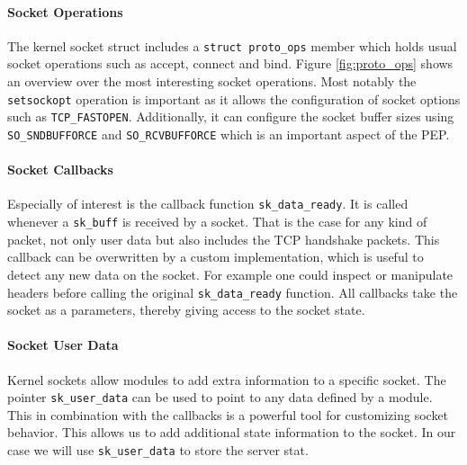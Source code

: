 \documentclass[a4paper,english, 11pt]{report}
\begin{document}
\paragraph{Socket Operations}
The kernel socket struct includes a \verb|struct proto_ops| member which holds usual socket operations such as accept, connect and bind.
Figure \ref{fig:proto_ops} shows an overview over the most interesting socket operations. Most notably the \verb|setsockopt| operation is important as it allows the configuration of socket options such as \verb|TCP_FASTOPEN|. Additionally, it can configure the socket buffer sizes using \verb|SO_SNDBUFFORCE| and \verb|SO_RCVBUFFORCE| which is an important aspect of the PEP.

\paragraph{Socket Callbacks}
Especially of interest is the callback function \verb|sk_data_ready|. It is called whenever a \verb|sk_buff| is received by a socket. That is the case for any kind of packet, not only user data but also includes the TCP handshake packets. This callback can be overwritten by a custom implementation, which is useful to detect any new data on the socket. For example one could inspect or manipulate headers before calling the original \verb|sk_data_ready| function. All callbacks take the socket as a parameters, thereby giving access to the socket state. \\

\paragraph{Socket User Data}
Kernel sockets allow modules to add extra information to a specific socket. The pointer \verb|sk_user_data| can be used to point to any data defined by a module. This in combination with the callbacks is a powerful tool for customizing socket behavior. This allows us to add additional state information to the socket. In our case we will use \verb|sk_user_data| to store the server stat.\\
\end{document}
